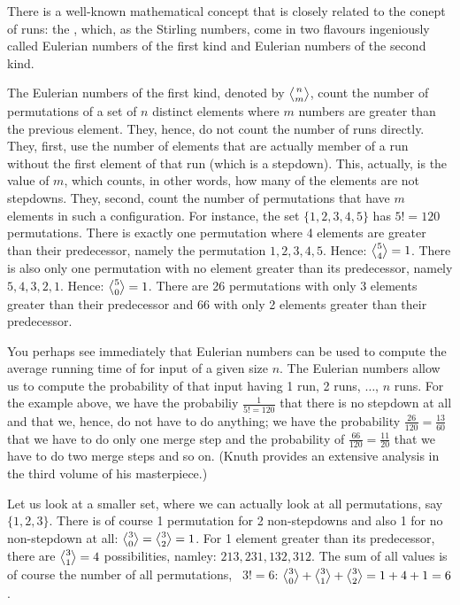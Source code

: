 \documentclass{scrreprt}
\newcommand{\texfamily}{\fontfamily{cmtex}\selectfont}
\begin{document}
There is a well-known mathematical concept 
that is closely related to the conept of runs:
the , which, as the Stirling numbers,
come in two flavours ingeniously called 
Eulerian numbers of the first kind and
Eulerian numbers of the second kind.

The Eulerian numbers of the first kind,
denoted by $\eulerianOne{n}{m}$, count
the number of permutations of a set of $n$ 
distinct elements where $m$ numbers are greater
than the previous element.
They, hence, do not count the number of runs
directly. 
They, first, use the number of elements 
that are actually member of a run without the first 
element of that run (which is a stepdown).
This, actually, is the value of $m$,
which counts, in other words, how many of the elements
are not stepdowns.
They, second, count the number of permutations
that have $m$ elements in such a configuration.
For instance, the set $\lbrace 1,2,3,4,5\rbrace$
has $5! = 120$ permutations.
There is exactly one permutation where 4 elements
are greater than their predecessor, namely 
the permutation $1,2,3,4,5$.
Hence: $\eulerianOne{5}{4} = 1$.
There is also only one permutation with no element
greater than its predecessor, namely $5,4,3,2,1$.
Hence: $\eulerianOne{5}{0} = 1$.
There are 26 permutations with only 3 elements
greater than their predecessor
and 66 with only 2 elements greater than their
predecessor.

You perhaps see immediately that Eulerian numbers
can be used to compute the average running time
of \text{\texfamily mergesort} for input of a given size $n$.
The Eulerian numbers allow us to compute
the probability of that input having
1 run, 2 runs, $\dots$, $n$ runs.
For the example above, we have the probabiliy
$\frac{1}{5! = 120}$ that there is no stepdown at all
and that we, hence, do not have to do anything;
we have the probability $\frac{26}{120} = \frac{13}{60}$
that we have to do only one merge step and
the probability of $\frac{66}{120} = \frac{11}{20}$
that we have to do two merge steps and so on.
(Knuth provides an extensive analysis 
in the third volume of his masterpiece.)

Let us look at a smaller set, where we can actually
look at all permutations, say $\lbrace 1,2,3\rbrace$.
There is of course 1 permutation for 2 non-stepdowns
and also 1 for no non-stepdown at all: 
$\eulerianOne{3}{0} = \eulerianOne{3}{2} = 1$.
For 1 element greater than its predecessor,
there are $\eulerianOne{3}{1} = 4$ possibilities,
namley: $213, 231, 132, 312$.
The sum of all values is of course the number
of all permutations, \ie\ $3! = 6$:
$\eulerianOne{3}{0} + \eulerianOne{3}{1} + \eulerianOne{3}{2} 
= 1 + 4 + 1 = 6$.
\end{document}
